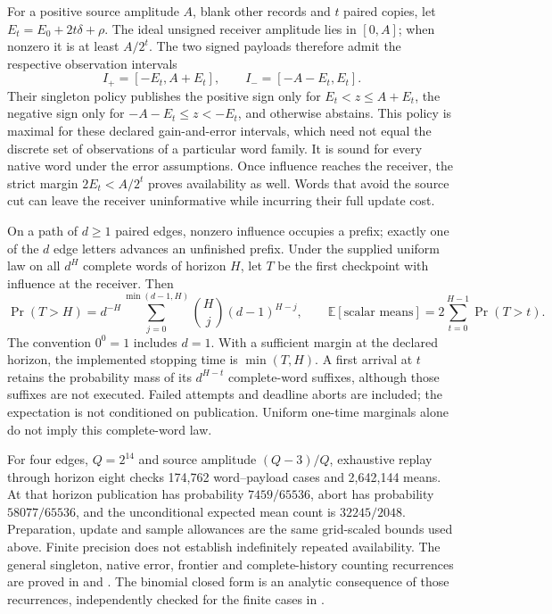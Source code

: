 For a positive source amplitude $A$, blank other records and $t$ paired
copies, let $E_t=E_0+2t\delta+\rho$. The ideal unsigned receiver amplitude
lies in $[0,A]$; when nonzero it is at least $A/2^t$. The two signed
payloads therefore admit the respective observation intervals
\[
 I_+=[-E_t,A+E_t],\qquad I_-=[-A-E_t,E_t].
\]
Their singleton policy publishes the positive sign only for
$E_t<z\leq A+E_t$, the negative sign only for
$-A-E_t\leq z<-E_t$, and otherwise abstains. This policy is maximal for
these declared gain-and-error intervals, which need not equal the discrete
set of observations of a particular word family. It is sound for every
native word under the error assumptions. Once influence reaches the
receiver, the strict margin $2E_t<A/2^t$ proves availability as well.
Words that avoid the source cut can leave the receiver uninformative while
incurring their full update cost.

On a path of $d\geq1$ paired edges, nonzero influence occupies a prefix;
exactly one of the $d$ edge letters advances an unfinished prefix. Under
the supplied uniform law on all $d^H$ complete words of horizon $H$, let
$T$ be the first checkpoint with influence at the receiver. Then
\[
 \Pr(T>H)=d^{-H}\sum_{j=0}^{\min(d-1,H)}
              {H\choose j}(d-1)^{H-j},\qquad
 \mathbb E[\text{scalar means}]
       =2\sum_{t=0}^{H-1}\Pr(T>t).
\]
The convention $0^0=1$ includes $d=1$. With a sufficient margin at the
declared horizon, the implemented stopping time is $\min(T,H)$.
A first arrival at $t$ retains the probability mass of its $d^{H-t}$
complete-word suffixes, although those suffixes are not executed. Failed
attempts and deadline aborts are included; the expectation is not
conditioned on publication. Uniform one-time marginals alone do not imply
this complete-word law.

For four edges, $Q=2^{14}$ and source amplitude $(Q-3)/Q$, exhaustive
replay through horizon eight checks 174,762 word--payload cases and
2,642,144 means. At that horizon publication has probability
$7459/65536$, abort has probability $58077/65536$, and the unconditional
expected mean count is $32245/2048$. Preparation, update and sample
allowances are the same grid-scaled bounds used above. Finite precision
does not establish indefinitely repeated availability.
The general singleton, native error, frontier and complete-history
counting recurrences are proved in
 and
. The binomial
closed form is an analytic consequence of those recurrences, independently
checked for the finite cases in .

